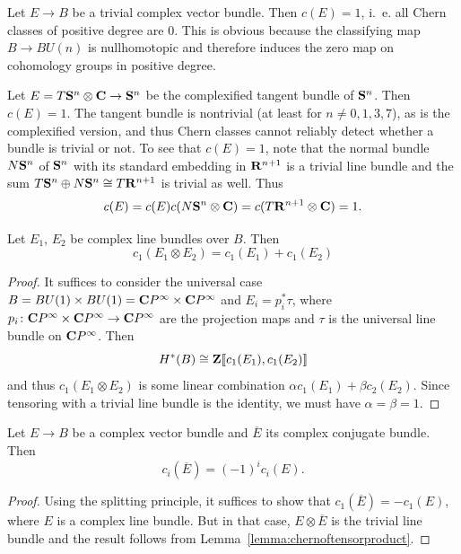 \documentclass[a4paper,openany]{scrbook}
\begin{document}
\begin{example}
Let $E \to B$ be a trivial complex vector bundle. Then $c(E) = 1$, i.~e. all Chern classes of positive degree are $0$. This is obvious because the classifying map $B \to BU(n)$ is nullhomotopic and therefore induces the zero map on cohomology groups in positive degree.
\end{example}

\begin{example}
Let $E=T\S^n \otimes \CC \to \S^n$ be the complexified tangent bundle of $\S^n$. Then $c(E)=1$. The tangent bundle is nontrivial (at least for $n \neq 0,1,3,7$), as is the complexified version, and thus Chern classes cannot reliably detect whether a bundle is trivial or not. To see that $c(E)=1$, note that the normal bundle $N\S^n$ of $\S^n$ with its standard embedding in $\R^{n+1}$ is a trivial line bundle and the sum $T\S^n \oplus N\S^n \cong T\R^{n+1}$ is trivial as well. Thus
\[
c(E) = c(E)c(N\S^n \otimes \CC) = c(T\R^{n+1}\otimes \CC) = 1.
\]
\end{example}

\begin{lemma}\label{lemma:chernoftensorproduct}
Let $E_1$, $E_2$ be complex line bundles over $B$. Then
\[
c_1(E_1 \otimes E_2) = c_1(E_1) + c_1(E_2)
\]
\end{lemma}
\begin{proof}
It suffices to consider the universal case $B=BU(1)\times BU(1) = \CP^\infty \times \CP^\infty$ and $E_i = p_i^*\tau$, where $p_i\colon \CP^\infty \times \CP^\infty \to \CP^\infty$ are the projection maps and $\tau$ is the universal line bundle on $\CP^\infty$. Then
\[
H^*(B) \cong \Z\pow{c_1(E_1),c_1(E_2)}
\]
and thus $c_1(E_1 \otimes E_2)$ is some linear combination $\alpha c_1(E_1) + \beta c_2(E_2)$. Since tensoring with a trivial line bundle is the identity, we must have $\alpha=\beta=1$. 
\end{proof}

\begin{lemma}
Let $E \to B$ be a complex vector bundle and $\overline E$ its complex conjugate bundle. Then
\[
c_i(\overline E) = (-1)^i c_i(E).
\]
\end{lemma}
\begin{proof}
Using the splitting principle, it suffices to show that $c_1(\overline E) = -c_1(E)$, where $E$ is a complex line bundle. But in that case, $E \otimes \overline E$ is the trivial line bundle and the result follows from Lemma~\ref{lemma:chernoftensorproduct}.
\end{proof}
\end{document}
